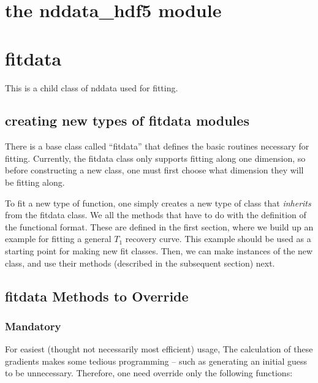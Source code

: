 \section{the nddata\_hdf5 module}
\section{fitdata}
This is a child class of nddata used for fitting.
\subsection{creating new types of fitdata modules}
There is a base class called ``fitdata'' that
    defines the basic routines necessary for fitting.
Currently, the fitdata class only supports fitting
    along one dimension, so before constructing a new class,
    one must first choose what dimension they will be fitting along.

To fit a new type of function,
    one simply creates a new type of class that
    {\it inherits} from the fitdata class.
We 
    all the methods that have to do with the definition
    of the functional format.
These are defined in the first section, where we build
    up an example for fitting a general $T_1$ recovery curve.
This example should be used as a starting point for making
    new fit classes.
Then, we can make instances of the new class,
    and use their methods (described in the subsequent section)
    next.
\subsection{fitdata Methods to Override}
\subsubsection{Mandatory}
For easiest (thought not necessarily most efficient) usage,
The calculation of these gradients makes some tedious
    programming -- such as generating an initial guess
    to be unnecessary.
Therefore, one need override only the following functions:
